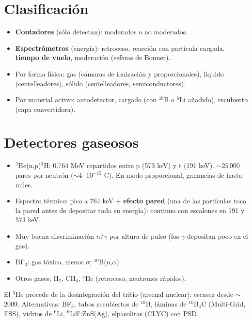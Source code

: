 \section{Clasificación}
\begin{itemize}
\item \textbf{Contadores} (sólo detectan): moderados o no moderados.
\item \textbf{Espectrómetros} (energía): retroceso, reacción con partícula cargada, \textbf{tiempo de vuelo}, moderación (esferas de Bonner).
\item Por forma física: gas (cámaras de ionización y proporcionales), líquido (centelleadores), sólido (centelleadores, semiconductores).
\item Por material activo: autodetector, cargado (con $^{10}$B o $^6$Li añadido), recubierto (capa convertidora).
\end{itemize}

\section{Detectores gaseosos}
\begin{clave}
\begin{itemize}
\item $^3$He(n,p)$^3$H: 0.764 MeV repartidos entre p (573 keV) y t (191 keV). $\sim25\,000$ pares por neutrón ($\sim4\cdot10^{-15}$ C).
En modo proporcional, ganancias de hasta miles.
\item Espectro térmico: pico a 764 keV + \textbf{efecto pared} (una de las partículas toca la pared antes de depositar toda su energía):
continuo con escalones en 191 y 573 keV.
\item Muy buena discriminación $n/\gamma$ por altura de pulso (los $\gamma$ depositan poco en el gas).
\item BF$_3$: gas tóxico, menor $\sigma$; $^{10}$B(n,$\alpha$).
\item Otros gases: H$_2$, CH$_4$, $^4$He (retroceso, neutrones rápidos).
\end{itemize}
\end{clave}
\begin{dato}
El $^3$He procede de la desintegración del tritio (arsenal nuclear): escasez desde $\sim$2009. Alternativas: BF$_3$, tubos recubiertos de $^{10}$B,
láminas de $^{10}$B$_4$C (Multi-Grid, ESS), vidrios de $^6$Li, $^6$LiF:ZnS(Ag), elpasolitas (CLYC) con PSD.
\end{dato}

